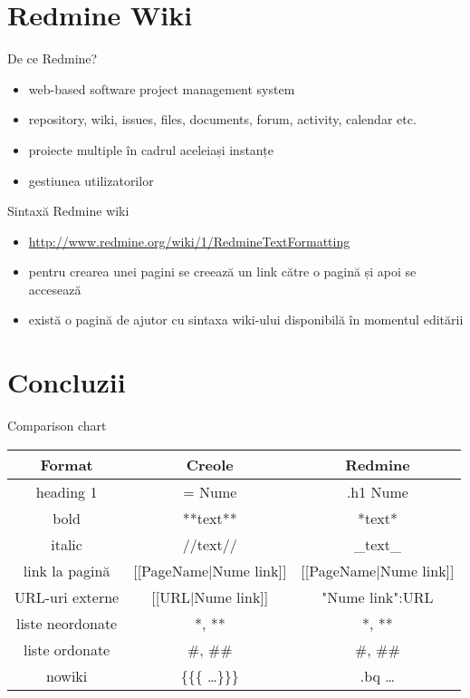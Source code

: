 \documentclass{beamer}
\begin{document}
\section{Redmine Wiki}

\frame{\tableofcontents[currentsection]}

\begin{frame}{De ce Redmine?}
  \begin{itemize}
    \item web-based software project management system
    \item repository, wiki, issues, files, documents, forum, activity,
calendar etc.
    \item proiecte multiple în cadrul aceleiași instanțe
    \item gestiunea utilizatorilor
  \end{itemize}
\end{frame}

\begin{frame}{Sintaxă Redmine wiki}
  \begin{itemize}
    \item \url{http://www.redmine.org/wiki/1/RedmineTextFormatting}
    \item pentru crearea unei pagini se creează un link către o pagină și apoi
se accesează
    \item există o pagină de ajutor cu sintaxa wiki-ului disponibilă în
momentul editării
  \end{itemize}
\end{frame}


\section{Concluzii}

\frame{\tableofcontents[currentsection]}

\begin{frame}{Comparison chart}
  \begin{center}
    \begin{tabular}{|c|c|c|}
      \hline
      \textbf{Format} & \textbf{Creole} & \textbf{Redmine} \\
      \hline
      \hline
      heading 1 & = Nume & .h1 Nume \\
      bold & **text** & *text* \\
      italic & //text// & \_text\_ \\
      link la pagină & [[PageName$|$Nume link]] & [[PageName$|$Nume link]] \\
      URL-uri externe & [[URL$|$Nume link]] & "Nume link":URL \\
      liste neordonate & *, ** & *, ** \\
      liste ordonate & \#, \#\# & \#, \#\# \\
      nowiki & \{\{\{ \ldots \}\}\} & .bq \ldots \\
      \hline
    \end{tabular}
  \end{center}
\end{frame}
\end{document}
